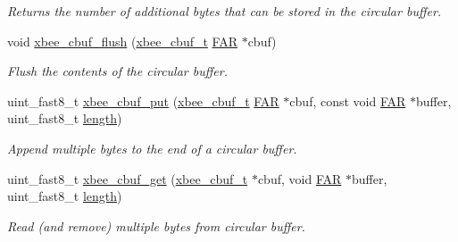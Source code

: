 \begin{DoxyCompactItemize}
\begin{DoxyCompactList}\small\item\em Returns the number of additional bytes that can be stored in the circular buffer. \end{DoxyCompactList}\item 
void \hyperlink{group__util__cbuf_gaf0cf797a0e4ee8c9e518e0d8b9554b10}{xbee\-\_\-cbuf\-\_\-flush} (\hyperlink{structxbee__cbuf__t}{xbee\-\_\-cbuf\-\_\-t} \hyperlink{group__hal_gaef060b3456fdcc093a7210a762d5f2ed}{F\-A\-R} $\ast$cbuf)
\begin{DoxyCompactList}\small\item\em Flush the contents of the circular buffer. \end{DoxyCompactList}\item 
uint\-\_\-fast8\-\_\-t \hyperlink{group__util__cbuf_gad3d314f23c6c7c6fc31c9b65ce61eee1}{xbee\-\_\-cbuf\-\_\-put} (\hyperlink{structxbee__cbuf__t}{xbee\-\_\-cbuf\-\_\-t} \hyperlink{group__hal_gaef060b3456fdcc093a7210a762d5f2ed}{F\-A\-R} $\ast$cbuf, const void \hyperlink{group__hal_gaef060b3456fdcc093a7210a762d5f2ed}{F\-A\-R} $\ast$buffer, uint\-\_\-fast8\-\_\-t \hyperlink{group__zdo_gab2b3adeb2a67e656ff030b56727fd0ac}{length})
\begin{DoxyCompactList}\small\item\em Append multiple bytes to the end of a circular buffer. \end{DoxyCompactList}\item 
uint\-\_\-fast8\-\_\-t \hyperlink{group__util__cbuf_ga98b2d80239319b2a9875772c28a7630a}{xbee\-\_\-cbuf\-\_\-get} (\hyperlink{structxbee__cbuf__t}{xbee\-\_\-cbuf\-\_\-t} $\ast$cbuf, void \hyperlink{group__hal_gaef060b3456fdcc093a7210a762d5f2ed}{F\-A\-R} $\ast$buffer, uint\-\_\-fast8\-\_\-t \hyperlink{group__zdo_gab2b3adeb2a67e656ff030b56727fd0ac}{length})
\begin{DoxyCompactList}\small\item\em Read (and remove) multiple bytes from circular buffer. \end{DoxyCompactList}\end{DoxyCompactItemize}
